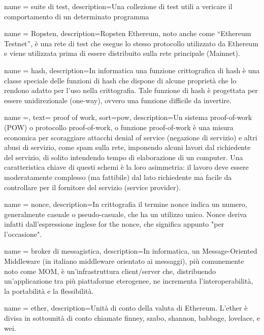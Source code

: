{
    name = {suite di test},
    description={Una collezione di test utili a vericare il comportamento di un determinato programma}
}

{
    name = {Ropsten},
    description={Ropsten Ethereum, noto anche come “Ethereum Testnet”, è una rete di test che esegue lo stesso protocollo utilizzato da Ethereum e viene utilizzata prima di essere distribuito sulla rete principale (Mainnet).}
}


{
    name = {hash},
    description={In informatica una funzione crittografica di hash è una classe speciale delle funzioni di hash che dispone di alcune proprietà che lo rendono adatto per l'uso nella crittografia. Tale funzione di hash è progettata per essere unidirezionale (one-way), ovvero una funzione difficile da invertire. }
}


{
    name =,
    text= proof of work,
    sort=pow,
    description={Un sistema proof-of-work (POW) o protocollo proof-of-work, o funzione proof-of-work è una misura economica per scoraggiare attacchi denial of service (negazione di servizio) e altri abusi di servizio, come spam sulla rete, imponendo alcuni lavori dal richiedente del servizio, di solito intendendo tempo di elaborazione di un computer. Una caratteristica chiave di questi schemi è la loro asimmetria: il lavoro deve essere moderatamente complesso (ma fattibile) dal lato richiedente ma facile da controllare per il fornitore del servizio (service provider). }
}


{
    name = {nonce},
    description={In crittografia il termine nonce indica un numero, generalmente casuale o pseudo-casuale, che ha un utilizzo unico. Nonce deriva infatti dall'espressione inglese for the nonce, che significa appunto "per l'occasione".}
}


{
    name = {broker di messagistica},
    description={In informatica, un Message-Oriented Middleware (in italiano middleware orientato ai messaggi), più comunemente noto come MOM, è un'infrastruttura client/server che, distribuendo un'applicazione tra più piattaforme eterogenee, ne incrementa l'interoperabilità, la portabilità e la flessibilità. }
}



{
    name = {ether},
    description={Unità di conto della valuta di Ethereum.  L'ether è divisa in sottounità di conto chiamate finney, szabo, shannon, babbage, lovelace, e wei.}
}


